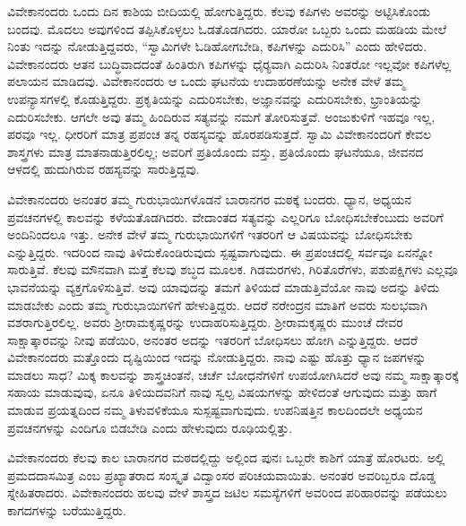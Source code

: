  ವಿವೇಕಾನಂದರು ಒಂದು ದಿನ ಕಾಶಿಯ ಬೀದಿಯಲ್ಲಿ ಹೋಗುತ್ತಿದ್ದರು. ಕೆಲವು ಕಪಿಗಳು ಅವರನ್ನು ಅಟ್ಟಿಸಿಕೊಂಡು ಬಂದವು. ಮೊದಲು ಅವುಗಳಿಂದ ತಪ್ಪಿಸಿಕೊಳ್ಳಲು ಓಡತೊಡಗಿದರು. ಯಾರೋ ಒಬ್ಬರು ಒಂದು ಮಹಡಿಯ ಮೇಲೆ ನಿಂತು ಇದನ್ನು ನೋಡುತ್ತಿದ್ದವರು, “ಸ್ವಾಮಿಗಳೇ ಓಡಿಹೋಗಬೇಡಿ, ಕಪಿಗಳನ್ನು ಎದುರಿಸಿ” ಎಂದು ಹೇಳಿದರು. ವಿವೇಕಾನಂದರು ಆತನ ಬುದ್ಧಿವಾದದಂತೆ ಹಿಂತಿರುಗಿ ಕಪಿಗಳನ್ನು ಧೈರ‍್ಯವಾಗಿ ಎದುರಿಸಿ ನಿಂತರೋ ಇಲ್ಲವೋ ಕಪಿಗಳೆಲ್ಲ ಪಲಾಯನ ಮಾಡಿದವು. ವಿವೇಕಾನಂದರು ಆ ಒಂದು ಘಟನೆಯ ಉದಾಹರಣೆಯನ್ನು ಅನೇಕ ವೇಳೆ ತಮ್ಮ ಉಪನ್ಯಾಸಗಳಲ್ಲಿ ಕೊಡುತ್ತಿದ್ದರು. ಪ್ರಕೃತಿಯನ್ನು ಎದುರಿಸಬೇಕು, ಅಜ್ಞಾನವನ್ನು ಎದುರಿಸಬೇಕು, ಭ್ರಾಂತಿಯನ್ನು ಎದುರಿಸಬೇಕು. ಆಗಲೇ ಅವು ತಮ್ಮ ಹಿಂದಿರುವ ಸತ್ಯವನ್ನು ನಮಗೆ ತೋರಿಸುತ್ತವೆ. ಅಂಜುಕುಳಿಗೆ ಇಹವೂ ಇಲ್ಲ, ಪರವೂ ಇಲ್ಲ. ಧೀರರಿಗೆ ಮಾತ್ರ ಪ್ರಪಂಚ ತನ್ನ ರಹಸ್ಯವನ್ನು ಹೊರಪಡಿಸುತ್ತದೆ. ಸ್ವಾಮಿ ವಿವೇಕಾನಂದರಿಗೆ ಕೇವಲ ಶಾಸ್ತ್ರಗಳು ಮಾತ್ರ ಮಾತನಾಡುತ್ತಿರಲಿಲ್ಲ; ಅವರಿಗೆ ಪ್ರತಿಯೊಂದು ವಸ್ತು, ಪ್ರತಿಯೊಂದು ಘಟನೆಯೂ, ಜೀವನದ ಆಳದಲ್ಲಿ ಹುದುಗಿರುವ ರಹಸ್ಯವನ್ನು ಸಾರುತ್ತಿದ್ದವು. 

 ವಿವೇಕಾನಂದರು ಅನಂತರ ತಮ್ಮ ಗುರುಭಾಯಿಗಳೊಡನೆ ಬಾರಾನಗರ ಮಠಕ್ಕೆ ಬಂದರು. ಧ್ಯಾನ, ಅಧ್ಯಯನ ಪ್ರವಚನಗಳಲ್ಲಿ ಕಾಲವನ್ನು ಕಳೆಯತೊಡಗಿದರು. ವೇದಾಂತದ ಸತ್ಯವನ್ನು ಎಲ್ಲರಿಗೂ ಬೋಧಿಸಬೇಕೆಂಬುದು ಅವರಿಗೆ ಅಂದಿನಿಂದಲೂ ಇತ್ತು. ಅನೇಕ ವೇಳೆ ತಮ್ಮ ಗುರುಭಾಯಿಗಳಿಗೆ ಇತರರಿಗೆ ಆ ವಿಷಯವನ್ನು ಬೋಧಿಸಬೇಕು ಎನ್ನುತ್ತಿದ್ದರು. ಇದರಿಂದ ನಾವು ತಿಳಿದುಕೊಂಡಿರುವುದು ಸ್ಪಷ್ಟವಾಗುವುದು. ಈ ಪ್ರಪಂಚದಲ್ಲಿ ಸರ್ವವೂ ಏನನ್ನೋ ಸಾರುತ್ತಿವೆ. ಕೆಲವು ಮೌನವಾಗಿ ಮತ್ತೆ ಕೆಲವು ಶಬ್ಧದ ಮೂಲಕ. ಗಿಡಮರಗಳು, ಗಿರಿತೊರೆಗಳು, ಪಶುಪಕ್ಷಿಗಳು ಎಲ್ಲವೂ ಭಾವನೆಯನ್ನು ವ್ಯಕ್ತಗೊಳಿಸುತ್ತಿವೆ. ಅವು ಯಾವುದನ್ನು ತಮಗೆ ತಿಳಿಯದೆ ಮಾಡುತ್ತಿವೆಯೋ ನಾವು ಅದನ್ನು ತಿಳಿದು ಮಾಡಬೇಕು ಎಂದು ತಮ್ಮ ಗುರುಭಾಯಿಗಳಿಗೆ ಹೇಳುತ್ತಿದ್ದರು. ಆದರೆ ನರೇಂದ್ರನ ಮಾತಿಗೆ ಅವರು ಸುಲಭವಾಗಿ ವಶರಾಗುತ್ತಿರಲಿಲ್ಲ. ಅವರು ಶ‍್ರೀರಾಮಕೃಷ್ಣರನ್ನು ಉದಾಹರಿಸುತ್ತಿದ್ದರು. ಶ‍್ರೀರಾಮಕೃಷ್ಣರು ಮುಂಚೆ ದೇವರ ಸಾಕ್ಷಾತ್ಕಾರವನ್ನು ನೀವು ಪಡೆಯಿರಿ, ಅನಂತರ ಅದನ್ನು ಇತರರಿಗೆ ಬೋಧಿಸಲು ಹೋಗಿ ಎನ್ನುತ್ತಿದ್ದರು. ಆದರೆ ವಿವೇಕಾನಂದರು ಮತ್ತೊಂದು ದೃಷ್ಟಿಯಿಂದ ಇದನ್ನು ನೋಡುತ್ತಿದ್ದರು. ನಾವು ಎಷ್ಟು ಹೊತ್ತು ಧ್ಯಾನ ಜಪಗಳನ್ನು ಮಾಡಲು ಸಾಧ? ಮಿಕ್ಕ ಕಾಲವನ್ನು ಶಾಸ್ತ್ರಚಿಂತನೆ, ಚರ್ಚೆ ಬೋಧನೆಗಳಿಗೆ ಉಪಯೋಗಿಸಿದರೆ ಅವು ನಮ್ಮ ಸಾಕ್ಷಾತ್ಕಾರಕ್ಕೆ ಸಹಾಯ ಮಾಡುವುವು, ಏನೂ ತಿಳಿಯದವನಿಗೆ ನಾವು ಸ್ವಲ್ಪ ವಿಷಯಗಳನ್ನು ಹೇಳಿದಂತೆ ಆಗುವುದು ಮತ್ತು ಹಾಗೆ ಮಾಡುವ ಪ್ರಯತ್ನದಿಂದ ನಮ್ಮ ತಿಳುವಳಿಕೆಯೂ ಸುಸ್ಪಷ್ಟವಾಗುವುದು. ಉಪನಿಷತ್ತಿನ ಕಾಲದಿಂದಲೇ ಅಧ್ಯಯನ ಪ್ರವಚನಗಳನ್ನು ಎಂದಿಗೂ ಬಿಡಬೇಡಿ ಎಂದು ಹೇಳುವುದು ರೂಢಿಯಲ್ಲಿತ್ತು. 

 ವಿವೇಕಾನಂದರು ಕೆಲವು ಕಾಲ ಬಾರಾನಗರ ಮಠದಲ್ಲಿದ್ದು ಅಲ್ಲಿಂದ ಪುನಃ ಒಬ್ಬರೇ ಕಾಶಿಗೆ ಯಾತ್ರೆ ಹೊರಟರು. ಅಲ್ಲಿ ಪ್ರಮದದಾಸಮಿತ್ರ ಎಂಬ ಪ್ರಖ್ಯಾತರಾದ ಸಂಸ್ಕೃತ ವಿದ್ವಾಂಸರ ಪರಿಚಯವಾಯಿತು. ಅನಂತರ ಅವರಿಬ್ಬರೂ ದೊಡ್ಡ ಸ್ನೇಹಿತರಾದರು. ವಿವೇಕಾನಂದರು ಹಲವು ವೇಳೆ ಶಾಸ್ತ್ರದ ಜಟಿಲ ಸಮಸ್ಯೆಗಳಿಗೆ ಅವರಿಂದ ಪರಿಹಾರವನ್ನು ಪಡೆಯಲು ಕಾಗದಗಳನ್ನು ಬರೆಯುತ್ತಿದ್ದರು. 

